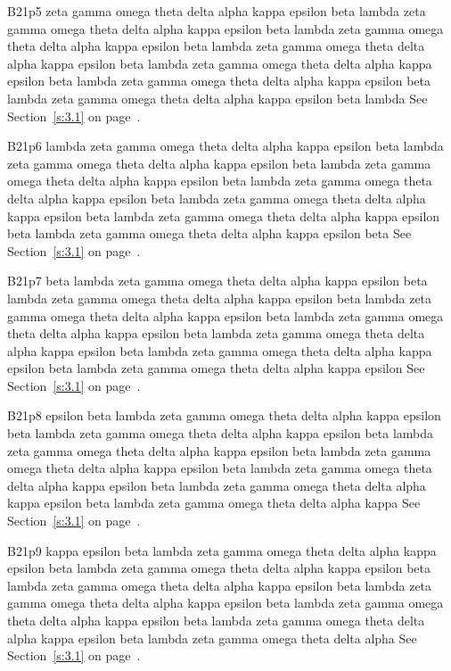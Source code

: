 B21p5 zeta gamma omega theta delta alpha kappa epsilon beta lambda zeta gamma omega theta delta alpha kappa epsilon beta lambda zeta gamma omega theta delta alpha kappa epsilon beta lambda zeta gamma omega theta delta alpha kappa epsilon beta lambda zeta gamma omega theta delta alpha kappa epsilon beta lambda zeta gamma omega theta delta alpha kappa epsilon beta lambda zeta gamma omega theta delta alpha kappa epsilon beta lambda See Section~\ref{s:3.1} on page~\pageref{s:3.1}.

B21p6 lambda zeta gamma omega theta delta alpha kappa epsilon beta lambda zeta gamma omega theta delta alpha kappa epsilon beta lambda zeta gamma omega theta delta alpha kappa epsilon beta lambda zeta gamma omega theta delta alpha kappa epsilon beta lambda zeta gamma omega theta delta alpha kappa epsilon beta lambda zeta gamma omega theta delta alpha kappa epsilon beta lambda zeta gamma omega theta delta alpha kappa epsilon beta See Section~\ref{s:3.1} on page~\pageref{s:3.1}.

B21p7 beta lambda zeta gamma omega theta delta alpha kappa epsilon beta lambda zeta gamma omega theta delta alpha kappa epsilon beta lambda zeta gamma omega theta delta alpha kappa epsilon beta lambda zeta gamma omega theta delta alpha kappa epsilon beta lambda zeta gamma omega theta delta alpha kappa epsilon beta lambda zeta gamma omega theta delta alpha kappa epsilon beta lambda zeta gamma omega theta delta alpha kappa epsilon See Section~\ref{s:3.1} on page~\pageref{s:3.1}.

B21p8 epsilon beta lambda zeta gamma omega theta delta alpha kappa epsilon beta lambda zeta gamma omega theta delta alpha kappa epsilon beta lambda zeta gamma omega theta delta alpha kappa epsilon beta lambda zeta gamma omega theta delta alpha kappa epsilon beta lambda zeta gamma omega theta delta alpha kappa epsilon beta lambda zeta gamma omega theta delta alpha kappa epsilon beta lambda zeta gamma omega theta delta alpha kappa See Section~\ref{s:3.1} on page~\pageref{s:3.1}.

B21p9 kappa epsilon beta lambda zeta gamma omega theta delta alpha kappa epsilon beta lambda zeta gamma omega theta delta alpha kappa epsilon beta lambda zeta gamma omega theta delta alpha kappa epsilon beta lambda zeta gamma omega theta delta alpha kappa epsilon beta lambda zeta gamma omega theta delta alpha kappa epsilon beta lambda zeta gamma omega theta delta alpha kappa epsilon beta lambda zeta gamma omega theta delta alpha See Section~\ref{s:3.1} on page~\pageref{s:3.1}.

